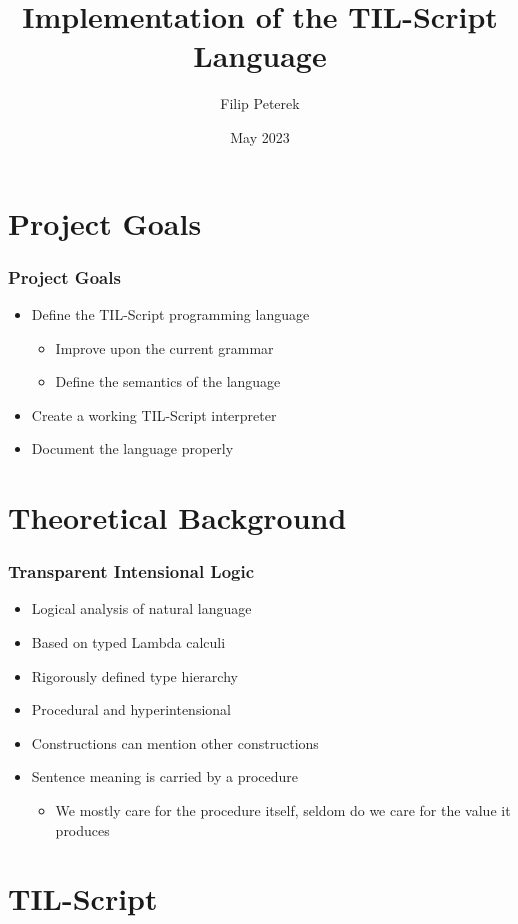 \documentclass{beamer}
\title{Implementation of the TIL-Script Language}
\author{Filip Peterek}
\institute{VSB -- Technical University of Ostrava}
\date{May 2023}
\begin{document}
\frame{\titlepage}

\section{Project Goals}

\begin{frame}
    \frametitle{Project Goals}
    \begin{itemize}
        \item Define the TIL-Script programming language
            \begin{itemize}
                \item Improve upon the current grammar
                \item Define the semantics of the language
            \end{itemize}
        \item Create a working TIL-Script interpreter
        \item Document the language properly
    \end{itemize}
\end{frame}

\section{Theoretical Background}

\begin{frame}
    \frametitle{Transparent Intensional Logic}
    \begin{itemize}
        \item Logical analysis of natural language
        \item Based on typed Lambda calculi
        \item Rigorously defined type hierarchy
        \item Procedural and hyperintensional
        \item Constructions can mention other constructions
        \item Sentence meaning is carried by a procedure
            \begin{itemize}
                \item We mostly care for the procedure itself, seldom do we care for the value
                it produces
            \end{itemize}
    \end{itemize}
\end{frame}

\section{TIL-Script}
\end{document}
